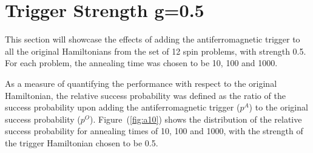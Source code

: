 \documentclass[../main.tex]{subfiles}
\begin{document}
\section{Trigger Strength g=0.5}
This section will showcase the effects of adding the antiferromagnetic trigger to  all the original Hamiltonians from the set of 12 spin problems, with strength 0.5. For each problem, the annealing time was chosen to be 10, 100 and 1000. 

As a measure of quantifying the performance with respect to the original Hamiltonian, the relative success probability was defined as the ratio of the success probability upon adding the antiferromagnetic trigger ($p^A$) to the original success probability ($p^O$). Figure~(\ref{fig:a10}) shows the distribution of the relative success probability for annealing times of 10, 100 and 1000, with the strength of the trigger Hamiltonian chosen to be 0.5.
\end{document}
